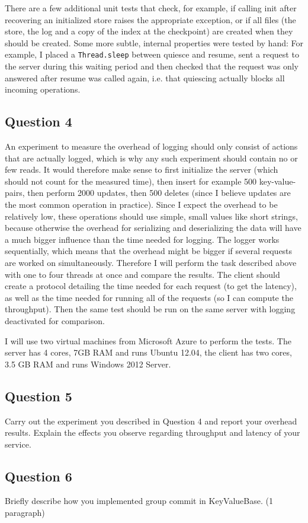 \documentclass[12pt,a4paper]{article}
\begin{document}
There are a few additional unit tests that check, for example, if calling init after recovering an initialized store raises the appropriate exception, or if all files (the store, the log and a copy of the index at the checkpoint) are created when they should be created. Some more subtle, internal properties were tested by hand: For example, I placed a \texttt{Thread.sleep} between quiesce and resume, sent a request to the server during this waiting period and then checked that the request was only answered after resume was called again, i.e. that quiescing actually blocks all incoming operations.

\subsection*{Question 4}
\label{sec:pq4}

An experiment to measure the overhead of logging should only consist of actions that are actually logged, which is why any such experiment should contain no or few reads. It would therefore make sense to first initialize the server (which should not count for the measured time), then insert for example 500 key-value-pairs, then perform 2000 updates, then 500 deletes (since I believe updates are the most common operation in practice). Since I expect the overhead to be relatively low, these operations should use simple, small values like short strings, because otherwise the overhead for serializing and deserializing the data will have a much bigger influence than the time needed for logging. The logger works sequentially, which means that the overhead might be bigger if several requests are worked on simultaneously. Therefore I will perform the task described above with one to four threads at once and compare the results. The client should create a protocol detailing the time needed for each request (to get the latency), as well as the time needed for running all of the requests (so I can compute the throughput). Then the same test should be run on the same server with logging deactivated for comparison.

I will use two virtual machines from Microsoft Azure to perform the tests. The server has 4 cores, 7GB RAM and runs Ubuntu 12.04, the client has two cores, 3.5 GB RAM and runs Windows 2012 Server.

\subsection*{Question 5}
\label{sec:pq5}
Carry out the experiment you described in Question 4 and report your overhead results.
Explain the effects you observe regarding throughput and latency of your service.


\subsection*{Question 6}
\label{sec:pq6}

Briefly describe how you implemented group commit in KeyValueBase. (1 paragraph)



 
\begin{thebibliography}{1}


\end{thebibliography}
\end{document}
